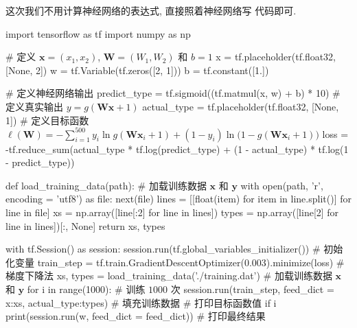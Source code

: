 \begin{frame}[fragile]{\insertsection}{\insertsubsection}
这次我们不用计算神经网络的表达式, 直接照着神经网络写 \tensorflow{} 代码即可.

\begin{pythoncode}[fontsize = \fontsize{8}{8}\selectfont]
import tensorflow as tf
import numpy as np

# 定义 $\bm{x} = (x_1, x_2)$, $\bm{W} = (W_1, W_2)$ 和 $b = 1$
x = tf.placeholder(tf.float32, [None, 2])
w = tf.Variable(tf.zeros([2, 1]))
b = tf.constant([1.])

# 定义神经网络输出
predict_type = tf.sigmoid((tf.matmul(x, w) + b) * 10)
# 定义真实输出 $y = g(\bm{W}\bm{x} + 1)$
actual_type = tf.placeholder(tf.float32, [None, 1])
# 定义目标函数 $\ell(\bm{W}) =  -\sum_{i = 1}^{500} y_i\ln g(\bm{W}\bm{x}_i + 1) + (1 - y_i)\ln\big(1 - g(\bm{W}\bm{x}_i + 1)\big)$
loss = -tf.reduce_sum(actual_type * tf.log(predict_type) + (1 - actual_type) * tf.log(1 - predict_type))
\end{pythoncode}

\vspace{-6.3cm}\hfill%
\end{frame}

\begin{frame}[fragile]{\insertsection}{\insertsubsection}
\begin{pythoncode}[fontsize = \fontsize{8}{8}\selectfont]
def load_training_data(path): # 加载训练数据 $\bm{x}$ 和 $\bm{y}$
  with open(path, 'r', encoding = 'utf8') as file:
    next(file)
    lines = [[float(item) for item in line.split()] for line in file]
    xs = np.array([line[:2] for line in lines])
    types = np.array([line[2] for line in lines])[:, None]
  return xs, types

with tf.Session() as session:
  session.run(tf.global_variables_initializer()) # 初始化变量
  train_step = tf.train.GradientDescentOptimizer(0.003).minimize(loss) # 梯度下降法
  xs, types = load_training_data('./training.dat') # 加载训练数据 $\bm{x}$ 和 $\bm{y}$
  for i in range(1000): # 训练 $1000$ 次
    session.run(train_step, feed_dict = {x:xs, actual_type:types}) # 填充训练数据
    # 打印目标函数值
    if i %
  print(session.run(w, feed_dict = feed_dict)) # 打印最终结果
\end{pythoncode}
\end{frame}

